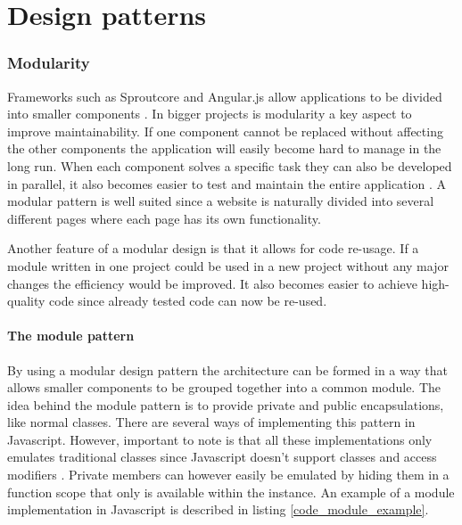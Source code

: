 \chapter{Design patterns}

\setcounter{section}{3}
\setcounter{subsection}{0}

\subsection{Modularity}

Frameworks such as Sproutcore and Angular.js allow applications to be divided into smaller components \cite{sproutcore_getting_started} \cite{angularjs_modules}. In bigger projects is modularity a key aspect to improve maintainability. If one component cannot be replaced without affecting the other components the application will easily become hard to manage in the long run. When each component solves a specific task they can also be developed in parallel, it also becomes easier to test and maintain the entire application \cite{addy_osmani_modular_js}. A modular pattern is well suited since a website is naturally divided into several different pages where each page has its own functionality.

Another feature of a modular design is that it allows for code re-usage. If a module written in one project could be used in a new project without any major changes the efficiency would be improved. It also becomes easier to achieve high-quality code since already tested code can now be re-used.

\subsubsection{The module pattern}
By using a modular design pattern the architecture can be formed in a way that allows smaller components to be grouped together into a common module. The idea behind the module pattern is to provide private and public encapsulations, like normal classes. There are several ways of implementing this pattern in Javascript. However, important to note is that all these implementations only emulates traditional classes since Javascript doesn't support classes and access modifiers \cite[p. 27]{addy_osmani_design_patterns}. Private members can however easily be emulated by hiding them in a function scope that only is available within the instance. An example of a module implementation in Javascript is described in listing \ref{code_module_example}.

